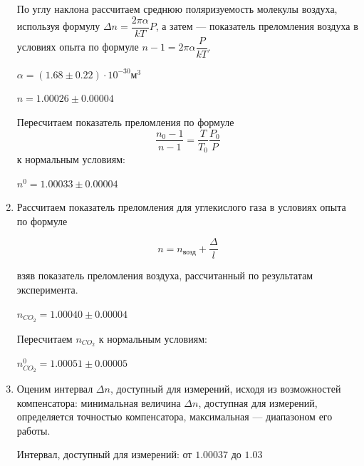 \documentclass[a4paper, 12pt]{article}
\begin{document}
\begin{enumerate}
    По углу наклона рассчитаем среднюю поляризуемость молекулы воздуха, используя формулу $\Delta n = \dfrac{2 \pi \alpha}{kT}P$, а затем — показатель преломления воздуха в условиях опыта по формуле $n - 1 = 2 \pi \alpha \dfrac{P}{kT}$.

    $\alpha = (1.68 \pm 0.22) \cdot 10^{-30} \text{м}^3$

    $n = 1.00026 \pm 0.00004$

    Пересчитаем показатель преломления по формуле 
    \begin{equation*}
        \dfrac{n_0 - 1}{n - 1} = \dfrac{T}{T_0} \dfrac{P_0}{P}
    \end{equation*}
    к нормальным условиям:

    $n^0 = 1.00033 \pm 0.00004$

    \item Рассчитаем показатель преломления для углекислого газа в условиях опыта по формуле
    
    \begin{equation*}
        n = n_{возд} + \dfrac{\Delta}{l}
    \end{equation*}

    взяв показатель преломления воздуха, рассчитанный по результатам эксперимента.

    $n_{CO_2} = 1.00040 \pm 0.00004$

    Пересчитаем $n_{CO_2}$ к нормальным условиям:

    $n_{CO_2}^0 = 1.00051 \pm 0.00005$
    
    \item Оценим интервал $\Delta n$, доступный для измерений, исходя из возможностей компенсатора: минимальная величина $\Delta n$, доступная для измерений, определяется точностью компенсатора, максимальная — диапазоном его работы.
    
    Интервал, доступный для измерений: от $1.00037$ до $1.03$ 
\end{enumerate}
\end{document}
